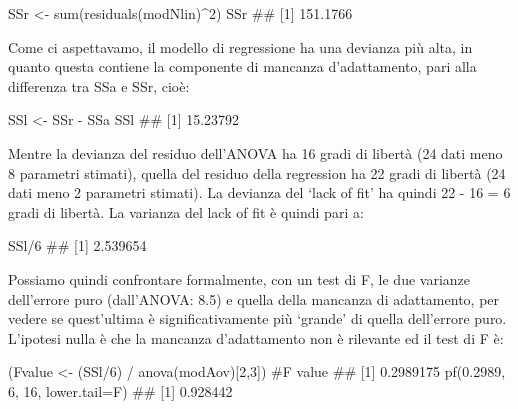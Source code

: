 \documentclass[a4paper,12pt,oneside]{book}
\newenvironment{Shaded}{\begin{snugshade}}{\end{snugshade}}
\newcommand{\DecValTok}[1]{#1}
\newcommand{\FloatTok}[1]{#1}
\newcommand{\SpecialCharTok}[1]{#1}
\newcommand{\CommentTok}[1]{#1}
\newcommand{\DocumentationTok}[1]{#1}
\newcommand{\OtherTok}[1]{#1}
\newcommand{\FunctionTok}[1]{#1}
\newcommand{\AttributeTok}[1]{#1}
\newcommand{\NormalTok}[1]{#1}
\begin{document}
\begin{Shaded}
\begin{Highlighting}[]
\NormalTok{SSr }\OtherTok{\textless{}{-}} \FunctionTok{sum}\NormalTok{(}\FunctionTok{residuals}\NormalTok{(modNlin)}\SpecialCharTok{\^{}}\DecValTok{2}\NormalTok{)}
\NormalTok{SSr}
\DocumentationTok{\#\# [1] 151.1766}
\end{Highlighting}
\end{Shaded}

Come ci aspettavamo, il modello di regressione ha una devianza più alta, in quanto questa contiene la componente di mancanza d'adattamento, pari alla differenza tra SSa e SSr, cioè:

\begin{Shaded}
\begin{Highlighting}[]
\NormalTok{SSl }\OtherTok{\textless{}{-}}\NormalTok{ SSr }\SpecialCharTok{{-}}\NormalTok{ SSa}
\NormalTok{SSl}
\DocumentationTok{\#\# [1] 15.23792}
\end{Highlighting}
\end{Shaded}

Mentre la devianza del residuo dell'ANOVA ha 16 gradi di libertà (24 dati meno 8 parametri stimati), quella del residuo della regression ha 22 gradi di libertà (24 dati meno 2 parametri stimati). La devianza del `lack of fit' ha quindi 22 - 16 = 6 gradi di libertà. La varianza del lack of fit è quindi pari a:

\begin{Shaded}
\begin{Highlighting}[]
\NormalTok{SSl}\SpecialCharTok{/}\DecValTok{6}
\DocumentationTok{\#\# [1] 2.539654}
\end{Highlighting}
\end{Shaded}

Possiamo quindi confrontare formalmente, con un test di F, le due varianze dell'errore puro (dall'ANOVA: 8.5) e quella della mancanza di adattamento, per vedere se quest'ultima è significativamente più `grande' di quella dell'errore puro. L'ipotesi nulla è che la mancanza d'adattamento non è rilevante ed il test di F è:

\begin{Shaded}
\begin{Highlighting}[]
\NormalTok{(Fvalue }\OtherTok{\textless{}{-}}\NormalTok{ (SSl}\SpecialCharTok{/}\DecValTok{6}\NormalTok{) }\SpecialCharTok{/} \FunctionTok{anova}\NormalTok{(modAov)[}\DecValTok{2}\NormalTok{,}\DecValTok{3}\NormalTok{]) }\CommentTok{\#F value}
\DocumentationTok{\#\# [1] 0.2989175}
\FunctionTok{pf}\NormalTok{(}\FloatTok{0.2989}\NormalTok{, }\DecValTok{6}\NormalTok{, }\DecValTok{16}\NormalTok{, }\AttributeTok{lower.tail=}\NormalTok{F)}
\DocumentationTok{\#\# [1] 0.928442}
\end{Highlighting}
\end{Shaded}
\end{document}
